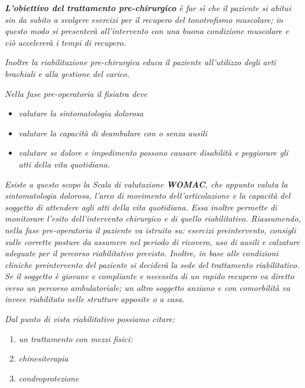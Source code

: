 \emph{\textbf{L'obiettivo del trattamento pre-chirurgico} è far sì che
il paziente si abitui sin da subito a svolgere esercizi per il recupero
del tonotrofismo muscolare; in questo modo si presenterà all'intervento
con una buona condizione muscolare e ciò accelererà i tempi di
recupero.}

\emph{Inoltre la riabilitazione pre-chirurgica educa il paziente
all'utilizzo degli arti brachiali e alla gestione del carico.}

\emph{Nella \emph{fase pre-operatoria} il fisiatra deve}


\begin{itemize}
\item
  
  \emph{valutare la sintomatologia dolorosa}
  
\item
  
  \emph{valutare la capacità di deambulare con o senza ausili}
  
\item
  
  \emph{valutare se dolore e impedimento possono causare disabilità e
  peggiorare gli atti della vita quotidiana.}
  
\end{itemize}



\emph{Esiste a questo scopo la Scala di valutazione \textbf{WOMAC}, che
appunto valuta la sintomatologia dolorosa, l'arco di movimento
dell'articolazione e la capacità del soggetto di attendere agli atti
della vita quotidiana. Essa inoltre permette di monitorare l'esito
dell'intervento chirurgico e di quello riabilitativo. Riassumendo, nella
fase pre-operatoria il paziente va istruito su: esercizi preintervento,
consigli sulle corrette posture da assumere nel periodo di ricovero, uso
di ausili e calzature adeguate per il percorso riabilitativo previsto.
Inoltre, in base alle condizioni cliniche preintervento del paziente si
deciderà la sede del trattamento riabilitativo. Se il soggetto è giovane
e compliante e necessita di un rapido recupero va diretto verso un
percorso ambulatoriale; un altro soggetto anziano e con comorbilità va
invece riabilitato nelle strutture apposite o a casa.}

\emph{Dal punto di vista riabilitativo possiamo citare: }

\begin{enumerate}
\item 
\textit{un trattamento con mezzi fisici:}
\item
  \emph{chinesiterapia}
\item
  \emph{condroprotezione}
\end{enumerate}

